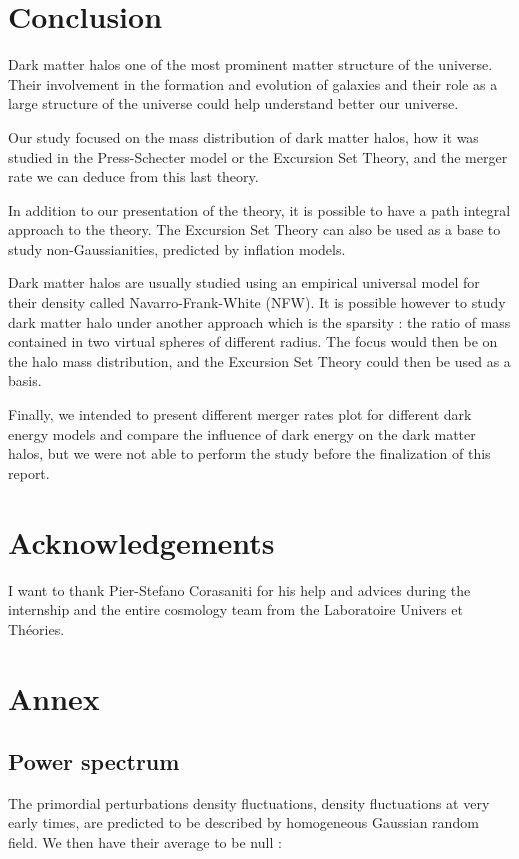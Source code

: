 \newpage
\section*{Conclusion}

Dark matter halos one of the most prominent matter structure of the universe. Their involvement in the formation and evolution of galaxies and their role as a large structure of the universe could help understand better our universe.

Our study focused on the mass distribution of dark matter halos, how it was studied in the Press-Schecter model or the Excursion Set Theory, and the merger rate we can deduce from this last theory.

In addition to our presentation of the theory, it is possible to have a path integral approach to the theory. The Excursion Set Theory can also be used as a base to study non-Gaussianities, predicted by inflation models.

Dark matter halos are usually studied using an empirical universal model for their density called Navarro-Frank-White (NFW). It is possible however to study dark matter halo under another approach which is the sparsity : the ratio of mass contained in two virtual spheres of different radius.
The focus would then be on the halo mass distribution, and the Excursion Set Theory could then be used as a basis.


Finally, we intended to present different merger rates plot for different dark energy models and compare the influence of dark energy on the dark matter halos, but we were not able to perform the study before the finalization of this report.


\section*{Acknowledgements}

I want to thank Pier-Stefano Corasaniti for his help and advices during the internship and the entire cosmology team from the Laboratoire Univers et Théories.




\newpage
\section*{Annex}


\subsection*{Power spectrum}
\label{Power spectrum Txt}
The primordial perturbations density fluctuations, density fluctuations at very early times, are predicted to be described by homogeneous Gaussian random field. We then have their average to be null :

